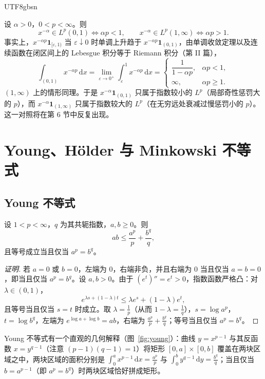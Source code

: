 \documentclass[11pt]{article}
\newcommand{\dx}{\,\mathrm{d}x}
\newcommand{\ind}{\mathbf{1}}
\begin{document}
\begin{CJK*}{UTF8}{gbsn}
\begin{example}[幂函数]\label{ex:power}
设 $\alpha>0$，$0<p<\infty$。则
\[
x^{-\alpha}\in L^{p}(0,1)\iff \alpha p<1,\qquad x^{-\alpha}\in L^{p}(1,\infty)\iff \alpha p>1 .
\]
事实上，$x^{-\alpha p}\ind_{[\varepsilon,1)}$ 当 $\varepsilon\downarrow0$ 时单调上升趋于 $x^{-\alpha p}\ind_{(0,1)}$，由单调收敛定理以及连续函数在闭区间上的 Lebesgue 积分等于 Riemann 积分（第 II 篇），
\[
\int_{(0,1)}x^{-\alpha p}\dx=\lim_{\varepsilon\to0^{+}}\int_{\varepsilon}^{1}x^{-\alpha p}\dx=\begin{cases}\dfrac{1}{1-\alpha p},&\alpha p<1,\\[2mm] \infty,&\alpha p\ge1.\end{cases}
\]
$(1,\infty)$ 上的情形同理。于是 $x^{-\alpha}\ind_{(0,1)}$ 只属于指数较小的 $L^{p}$（局部奇性惩罚大的 $p$），而 $x^{-\alpha}\ind_{(1,\infty)}$ 只属于指数较大的 $L^{p}$（在无穷远处衰减过慢惩罚小的 $p$）。这一对照将在第 6 节中反复出现。
\end{example}

\section{Young、Hölder 与 Minkowski 不等式}

\subsection{Young 不等式}

\begin{lemma}\label{lem:young}
设 $1<p<\infty$，$q$ 为其共轭指数，$a,b\ge0$。则
\[
ab\le\frac{a^{p}}{p}+\frac{b^{q}}{q},
\]
且等号成立当且仅当 $a^{p}=b^{q}$。
\end{lemma}

\begin{proof}[证明]
若 $a=0$ 或 $b=0$，左端为 $0$，右端非负，并且右端为 $0$ 当且仅当 $a=b=0$，即当且仅当 $a^{p}=b^{q}$。设 $a,b>0$。由于 $(e^{t})''=e^{t}>0$，指数函数严格凸：对 $\lambda\in(0,1)$，
\[
e^{\lambda s+(1-\lambda)t}\le\lambda e^{s}+(1-\lambda)e^{t},
\]
且等号当且仅当 $s=t$ 时成立。取 $\lambda=\frac1p$（从而 $1-\lambda=\frac1q$），$s=\log a^{p}$，$t=\log b^{q}$，左端为 $e^{\log a+\log b}=ab$，右端为 $\frac{a^{p}}{p}+\frac{b^{q}}{q}$；等号当且仅当 $a^{p}=b^{q}$。
\end{proof}

\begin{remark}
Young 不等式有一个直观的几何解释（图~\ref{fig:young}）：曲线 $y=x^{p-1}$ 与其反函数 $x=y^{q-1}$（注意 $(p-1)(q-1)=1$）将矩形 $[0,a]\times[0,b]$ 覆盖在两块区域之中，两块区域的面积分别是 $\int_{0}^{a}x^{p-1}\dx=\frac{a^{p}}{p}$ 与 $\int_{0}^{b}y^{q-1}\,\mathrm{d}y=\frac{b^{q}}{q}$；当且仅当 $b=a^{p-1}$（即 $a^{p}=b^{q}$）时两块区域恰好拼成矩形。
\end{remark}


\end{CJK*}
\end{document}
